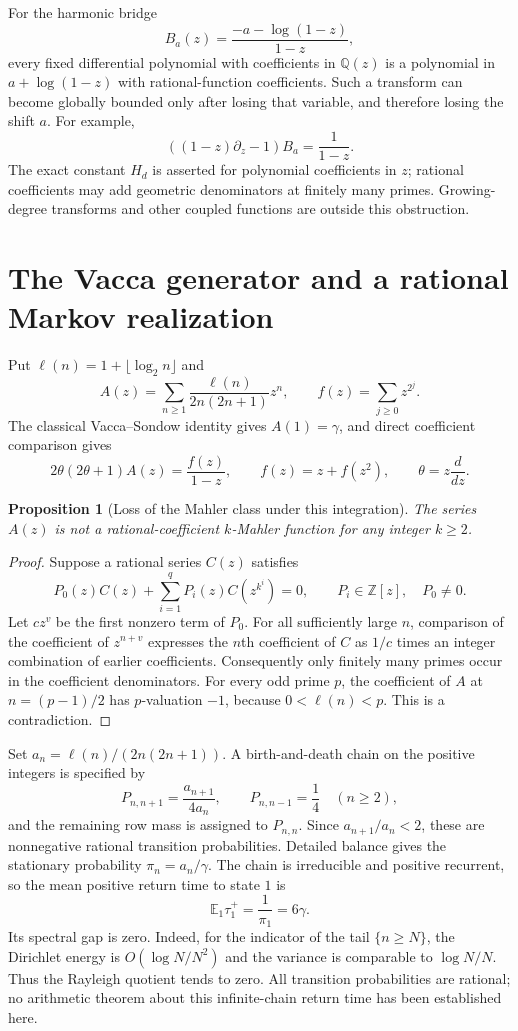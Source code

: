 \documentclass[11pt,a4paper]{article}
\newcommand{\Q}{\mathbb Q}
\newcommand{\Z}{\mathbb Z}
\newtheorem{proposition}[theorem]{Proposition}
\theoremstyle{definition}
\theoremstyle{remark}
\numberwithin{equation}{section}
\begin{document}
For the harmonic bridge
\[
 B_a(z)=\frac{-a-\log(1-z)}{1-z},
\]
every fixed differential polynomial with coefficients in $\Q(z)$ is a
polynomial in $a+\log(1-z)$ with rational-function coefficients.  Such a
transform can become globally bounded only after losing that variable,
and therefore losing the shift $a$.  For example,
\[
 ((1-z)\partial_z-1)B_a=\frac1{1-z}.
\]
The exact constant $H_d$ is asserted for polynomial coefficients in $z$;
rational coefficients may add geometric denominators at finitely many
primes.  Growing-degree transforms and other coupled functions are outside
this obstruction.

\section{The Vacca generator and a rational Markov realization}
\label{ec:vacca}

Put $\ell(n)=1+\lfloor\log_2n\rfloor$ and
\[
 A(z)=\sum_{n\ge1}\frac{\ell(n)}{2n(2n+1)}z^n,
 \qquad f(z)=\sum_{j\ge0}z^{2^j}.
\]
The classical Vacca--Sondow identity gives $A(1)=\gamma$, and direct
coefficient comparison gives
\[
 2\theta(2\theta+1)A(z)=\frac{f(z)}{1-z},\qquad
 f(z)=z+f(z^2),\qquad \theta=z\frac{d}{dz}.
\]

\begin{proposition}[Loss of the Mahler class under this integration]
\label{ec:not-mahler}
The series $A(z)$ is not a rational-coefficient $k$-Mahler function for
any integer $k\ge2$.
\end{proposition}
\begin{proof}
Suppose a rational series $C(z)$ satisfies
\[
 P_0(z)C(z)+\sum_{i=1}^qP_i(z)C(z^{k^i})=0,
 \qquad P_i\in\Z[z],\quad P_0\ne0.
\]
Let $cz^v$ be the first nonzero term of $P_0$.  For all sufficiently
large $n$, comparison of the coefficient of $z^{n+v}$ expresses the
$n$th coefficient of $C$ as $1/c$ times an integer combination of
earlier coefficients.  Consequently only finitely many primes occur in
the coefficient denominators.
For every odd prime $p$, the coefficient of $A$ at $n=(p-1)/2$ has
$p$-valuation $-1$, because $0<\ell(n)<p$.  This is a contradiction.
\end{proof}

Set $a_n=\ell(n)/(2n(2n+1))$.  A birth-and-death chain on the positive
integers is specified by
\[
 P_{n,n+1}=\frac{a_{n+1}}{4a_n},\qquad
 P_{n,n-1}=\frac14\quad(n\ge2),
\]
and the remaining row mass is assigned to $P_{n,n}$.  Since
$a_{n+1}/a_n<2$, these are nonnegative rational transition probabilities.
Detailed balance gives the stationary probability
$\pi_n=a_n/\gamma$.  The chain is irreducible and positive recurrent, so
the mean positive return time to state $1$ is
\[
 \mathbb E_1\tau_1^+=\frac1{\pi_1}=6\gamma.
\]
Its spectral gap is zero.  Indeed, for the indicator of the tail
$\{n\ge N\}$, the Dirichlet energy is
$O(\log N/N^2)$ and the variance is comparable to $\log N/N$.
Thus the Rayleigh quotient tends to zero.  All transition probabilities
are rational; no arithmetic theorem about this infinite-chain return time
has been established here.
\end{document}

